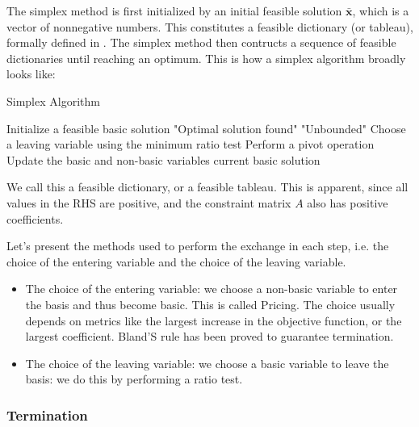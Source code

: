 The simplex method is first initialized by
an initial feasible solution $\mathbf{\bar{x}}$, which is a vector of nonnegative numbers.
This constitutes a feasible dictionary (or tableau), formally defined in \parencite{chvatal1983linear}.
The simplex method then contructs a sequence of feasible dictionaries until reaching an optimum.
This is how a simplex algorithm broadly looks like:

\begin{algorithm}
    \caption{Simplex Algorithm}
    \begin{algorithmic}[1]
        \State Initialize a feasible basic solution
        \State \Return "Optimal solution found"
        \EndIf
        \State \Return "Unbounded"
        \EndIf
        \State Choose a leaving variable using the minimum ratio test
        \State Perform a pivot operation
        \State Update the basic and non-basic variables
        \State \Return current basic solution
        \EndProcedure
    \end{algorithmic}
\end{algorithm}


We call this a feasible dictionary\parencite{chvatal1983linear}, or a feasible tableau. This is apparent, since all
values in the RHS are positive, and the constraint matrix $A$ also has positive coefficients.

Let's present the methods used to perform the exchange in each step, i.e. the choice of the entering
variable and the choice of the leaving variable.

\begin{itemize}
    \item The choice of the entering variable: we choose a non-basic variable to enter the basis
     and thus become basic. This is called Pricing. The choice usually depends on metrics 
     like the largest increase in the objective function, or the largest coefficient. Bland'S
     rule has been proved to guarantee termination.

    \item The choice of the leaving variable: we choose a basic variable to leave the basis:
    we do this by performing a ratio test.
\end{itemize}
\subsubsection{Termination}

